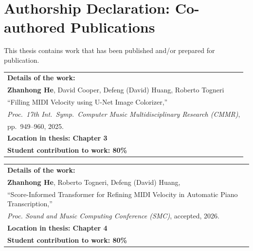 \section*{\Large Authorship Declaration: Co-authored Publications}
\vskip 0.4cm
This thesis contains work that has been published and/or prepared for publication. 
\vskip 0.6cm
	
\begin{tabular}{@{}p{\dimexpr\textwidth-2\tabcolsep\relax}@{}}
\textbf{Details of the work:} \\
\textbf{Zhanhong He}, David Cooper, Defeng (David) Huang, Roberto Togneri\\
``Filling MIDI Velocity using U-Net Image Colorizer,''\\
\emph{Proc.\ 17th Int.\ Symp.\ Computer Music Multidisciplinary Research (CMMR)},\\
pp.~949--960, 2025.\\
\textbf{Location in thesis: Chapter 3} \\
\textbf{Student contribution to work: 80\%} \\
\end{tabular} 
	
\vskip 0.6cm
	
\begin{tabular}{@{}p{\dimexpr\textwidth-2\tabcolsep\relax}@{}}
\textbf{Details of the work:} \\
\textbf{Zhanhong He}, Roberto Togneri, Defeng (David) Huang,\\
``Score-Informed Transformer for Refining MIDI Velocity in Automatic Piano Transcription,''\\
\emph{Proc. Sound and Music Computing Conference (SMC)}, accepted, 2026.\\ %
\textbf{Location in thesis: Chapter 4} \\
\textbf{Student contribution to work: 80\%} \\
\end{tabular} 
	
